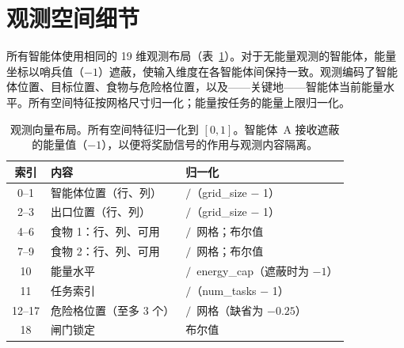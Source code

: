 \documentclass[zihao=5,a4paper,linespread=1.3,fontset=fandol]{ctexart}
\begin{document}
\section{观测空间细节}
\label{app:obs}

所有智能体使用相同的 19 维观测布局（表~\ref{tab:obs}）。对于无能量观测的智能体，能量坐标以哨兵值（$-1$）遮蔽，使输入维度在各智能体间保持一致。观测编码了智能体位置、目标位置、食物与危险格位置，以及——关键地——智能体当前能量水平。所有空间特征按网格尺寸归一化；能量按任务的能量上限归一化。

\begin{table}[h]
\centering
\caption{观测向量布局。所有空间特征归一化到 $[0,1]$。智能体~A 接收遮蔽的能量值（$-1$），以便将奖励信号的作用与观测内容隔离。}
\label{tab:obs}
\small
\begin{tabular}{@{}cll@{}}
\toprule
\textbf{索引} & \textbf{内容} & \textbf{归一化} \\
\midrule
0--1 & 智能体位置（行、列） & $/$（grid\_size $-$ 1） \\
2--3 & 出口位置（行、列） & $/$（grid\_size $-$ 1） \\
4--6 & 食物 1：行、列、可用 & $/$~网格；布尔值 \\
7--9 & 食物 2：行、列、可用 & $/$~网格；布尔值 \\
10   & 能量水平 & $/$~energy\_cap（遮蔽时为 $-1$） \\
11   & 任务索引 & $/$（num\_tasks $-$ 1） \\
12--17 & 危险格位置（至多 3 个） & $/$~网格（缺省为 $-0.25$） \\
18   & 闸门锁定 & 布尔值 \\
\bottomrule
\end{tabular}
\end{table}
\end{document}
